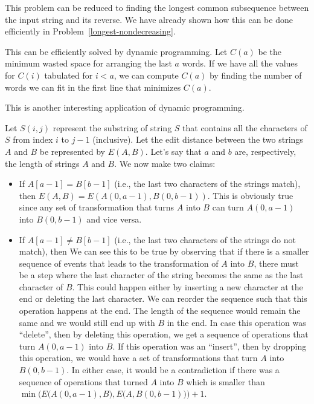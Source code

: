 This problem can be reduced to finding the longest common subsequence
between the input string and its reverse. We have already shown how
this can be done efficiently in Problem~\ref{longest-nondecreasing}.

This can be efficiently solved by dynamic programming. Let $C(a)$ be
the minimum wasted space for arranging the last $a$ words.  If we have
all the values for $C(i)$ tabulated for $i < a$, we can compute $C(a)$ 
by finding the number of words we can fit in the first line that
minimizes $C(a)$.   

This is another interesting application of dynamic programming.

Let $S(i,j)$ represent the substring of string $S$ that contains all
the characters of $S$ from index $i$ to $j-1$ (inclusive).  Let the edit
distance between the two strings $A$ and $B$ be represented by
$E(A,B)$. Let's say that $a$ and $b$ are, respectively,
the length of strings $A$ and $B$. We now make two claims:
\begin{itemize}
\itemsep 1pt
\item If $A[a-1]  = B[b-1]$ (i.e., the last two characters of the
  strings match), then $E(A,B) = E(A(0,a-1), B(0,b-1))$. This is
  obviously true since any set of transformation that turns $A$ into
  $B$  can turn $A(0,a-1)$ into $B(0,b-1)$ and vice versa.
\item If $A[a-1]  \not= B[b-1]$ (i.e., the last two characters of the
  strings do not match), then 
  We can see this to be true by observing that if
  there is a smaller sequence of events that leads to the transformation of
  $A$ into $B$, there must be a step where the last character of the
  string becomes the same as the last character of $B$.  This
  could happen either by inserting a new character at the end or
  deleting the last character. We can reorder the sequence such that
  this operation happens at the end. The length of the sequence would remain the same and we would still end up with $B$ in the end. In case this operation was ``delete'',
  then by deleting this operation, we get a sequence of operations
  that turn $A(0,a-1)$ into $B$. If this operation was an ``insert'', then
  by dropping this operation, we would have a set of transformations
  that turn $A$ into $B(0,b-1)$.  In either case, it would be a
  contradiction if there was a sequence of operations that turned $A$
  into $B$ which is smaller than $\min\Big(E\big(A(0,a-1), B\big), E\big(A,
  B(0,b-1)\big)\Big) + 1$.
\end{itemize}

